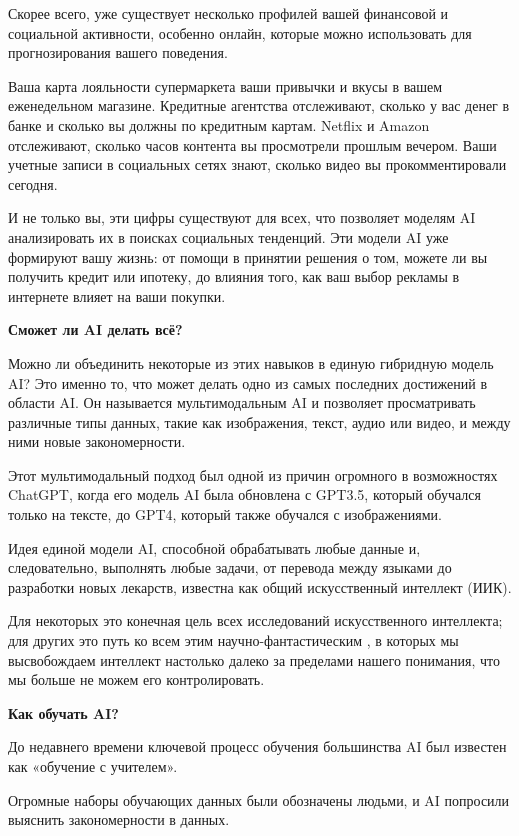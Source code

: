 Скорее всего, уже существует несколько профилей вашей финансовой и социальной активности, особенно онлайн, которые можно использовать для прогнозирования вашего поведения.

Ваша карта лояльности супермаркета  ваши привычки и вкусы в вашем еженедельном магазине. Кредитные агентства отслеживают, сколько у вас денег в банке и сколько вы должны по кредитным картам. Netflix и Amazon отслеживают, сколько часов контента вы просмотрели прошлым вечером. Ваши учетные записи в социальных сетях знают, сколько видео вы прокомментировали сегодня.

И не только вы, эти цифры существуют для всех, что позволяет моделям AI анализировать их в поисках социальных тенденций. Эти модели AI уже формируют вашу жизнь: от помощи в принятии решения о том, можете ли вы получить кредит или ипотеку, до влияния того, как ваш выбор рекламы в интернете влияет на ваши покупки.


\textbf{Сможет ли AI делать всё?}

Можно ли объединить некоторые из этих навыков в единую гибридную модель AI? Это именно то, что может делать одно из самых последних достижений в области AI. Он называется мультимодальным AI и позволяет просматривать различные типы данных, такие как изображения, текст, аудио или видео, и  между ними новые закономерности.

Этот мультимодальный подход был одной из причин огромного  в возможностях ChatGPT, когда его модель AI была обновлена с GPT3.5, который обучался только на тексте, до GPT4, который также обучался с изображениями.

Идея единой модели AI, способной обрабатывать любые данные и, следовательно, выполнять любые задачи, от перевода между языками до разработки новых лекарств, известна как общий искусственный интеллект (ИИК).

Для некоторых это конечная цель всех исследований искусственного интеллекта; для других это путь ко всем этим научно-фантастическим , в которых мы высвобождаем интеллект настолько далеко за пределами нашего понимания, что мы больше не можем его контролировать.


\textbf{Как обучать AI?}

До недавнего времени ключевой процесс обучения большинства AI был известен как «обучение с учителем».

Огромные наборы обучающих данных были обозначены людьми, и AI попросили выяснить закономерности в данных.

